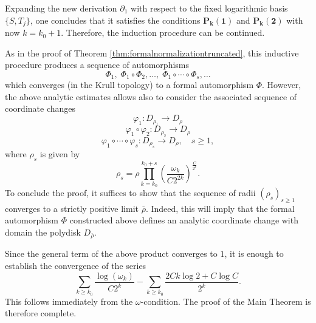 \documentclass[10pt,twoside,reqno]{amsart}
\theoremstyle{remark}
\theoremstyle{remark}
\newcommand{\tmmathbf}[1]{{\boldsymbol{#1}}}
\begin{document}
Expanding the new derivation $\partial_1$ with respect to the fixed logarithmic basis $\{S,T_j\}$, one concludes that it satisfies the conditions $\tmmathbf{P_k (1)}$
and $\tmmathbf{P_k (2)}$ with now $k = k_0 + 1$. Therefore, the induction procedure can be
continued.

As in the proof of Theorem \ref{thm:formalnormalizationtruncated}, this inductive procedure produces a sequence of automorphisms 
$$\Phi_1,\;\Phi_1 \circ \Phi_2,\ldots,\; \Phi_1 \circ \cdots \circ \Phi_s,\ldots$$ 
which converges (in the Krull topology) to a formal automorphism $\Phi$. However, the above analytic estimates allows also to consider the associated sequence of coordinate changes
\[ \varphi_1 : D_{\rho_1} \rightarrow D_{\rho} \]
\[ \varphi_1 \circ \varphi_2 : D_{\rho_2} \rightarrow D_{\rho} \]
\[ \varphi_1 \circ \cdots \circ \varphi_s : D_{\rho_s}
   \rightarrow D_{\rho} , \quad s\ge 1,\]
where $\rho_s$ is given by
\[ \rho_s = \rho \prod_{k = k_0}^{k_0 + s} \left( \frac{\omega_k}{C 2^{2 k}}
   \right)^{\frac{C}{2^k}}.  \]
To conclude the proof, it suffices to show that the sequence of radii $(\rho_s)_{s\ge 1}$
converges to a strictly positive limit $\overline{\rho}$. Indeed, this will imply that the formal automorphism $\Phi$ constructed above defines an analytic coordinate change with domain the polydisk $D_{\overline{\rho}}$. 

Since the general term of the above product converges to $1$, it is enough to establish
the convergence of the series
\[ \sum_{k \geqslant k_0}  \frac{\log (\omega_k)}{C 2^k} - \sum_{k \geqslant
   k_0} \frac{2 Ck \log 2 + C \log C}{2^k}. \]
This follows immediately from the $\omega$-condition. The proof of the Main Theorem is therefore complete.
\end{document}

